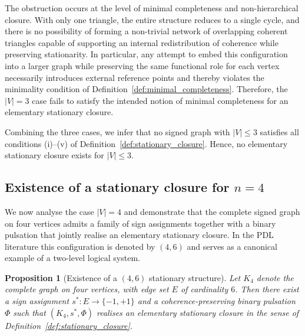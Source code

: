\documentclass[11pt,a4paper]{article}
\newtheorem{proposition}[theorem]{Proposition}
\theoremstyle{definition}
\begin{document}
The obstruction occurs at the level of minimal completeness and non-hierarchical closure. With only one triangle, the entire structure reduces to a single cycle, and there is no possibility of forming a non-trivial network of overlapping coherent triangles capable of supporting an internal redistribution of coherence while preserving stationarity.\cite{PDL_Main_2026,PDL_TO_Dialogue_2026} In particular, any attempt to embed this configuration into a larger graph while preserving the same functional role for each vertex necessarily introduces external reference points and thereby violates the minimality condition of Definition~\ref{def:minimal_completeness}. Therefore, the $|V|=3$ case fails to satisfy the intended notion of minimal completeness for an elementary stationary closure.

Combining the three cases, we infer that no signed graph with $|V|\leq 3$ satisfies all conditions (i)--(v) of Definition~\ref{def:stationary_closure}. Hence, no elementary stationary closure exists for $|V|\leq 3$.

\subsection{Existence of a stationary closure for \texorpdfstring{$n=4$}{n = 4}}

We now analyse the case $|V|=4$ and demonstrate that the complete signed graph on four vertices admits a family of sign assignments together with a binary pulsation that jointly realise an elementary stationary closure. In the PDL literature this configuration is denoted by $(4,6)$ and serves as a canonical example of a two-level logical system.\cite{PDL_Main_2026,PDL_Intro_2026}

\begin{proposition}[Existence of a $(4,6)$ stationary structure]
\label{prop:existence_4_6}
Let $K_4$ denote the complete graph on four vertices, with edge set $E$ of cardinality $6$. Then there exist a sign assignment $s^\ast : E \to \{-1,+1\}$ and a coherence-preserving binary pulsation $\Phi$ such that $(K_4,s^\ast,\Phi)$ realises an elementary stationary closure in the sense of Definition~\ref{def:stationary_closure}.
\end{proposition}
\end{document}
